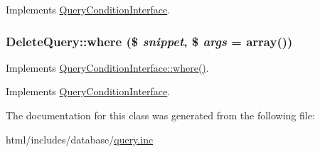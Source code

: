 Implements \hyperlink{interfaceQueryConditionInterface_a8aae11796846850edbf8caa3a9d4afcd}{QueryConditionInterface}.\hypertarget{classDeleteQuery_a1f4a560d33adeeab405fee5302a4a92e}{
\subsubsection[{where}]{\setlength{\rightskip}{0pt plus 5cm}DeleteQuery::where (\$ {\em snippet}, \/  \$ {\em args} = {\ttfamily array()})}}
\label{classDeleteQuery_a1f4a560d33adeeab405fee5302a4a92e}
Implements \hyperlink{interfaceQueryConditionInterface_a42c03c74dd81ef6d77041e67ec12e735}{QueryConditionInterface::where()}. 

Implements \hyperlink{interfaceQueryConditionInterface_a42c03c74dd81ef6d77041e67ec12e735}{QueryConditionInterface}.

The documentation for this class was generated from the following file:\begin{DoxyCompactItemize}
\item 
html/includes/database/\hyperlink{query_8inc}{query.inc}\end{DoxyCompactItemize}
